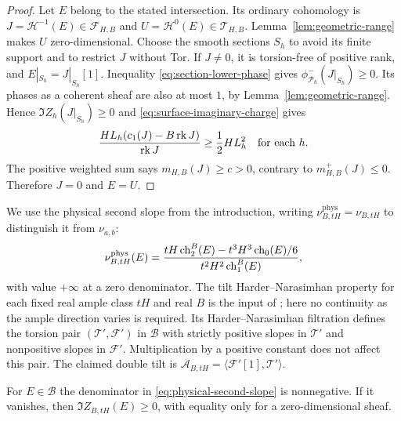 \begin{proof}
Let $E$ belong to the stated intersection.  Its ordinary cohomology is
$J=\mathcal H^{-1}(E)\in\mathcal F_{H,B}$ and
$U=\mathcal H^0(E)\in\mathcal T_{H,B}$.
Lemma~\ref{lem:geometric-range} makes $U$ zero-dimensional.
Choose the smooth sections $S_h$ to avoid its finite support and to
restrict $J$ without Tor.  If $J\ne0$, it is torsion-free of positive
rank, and $E|_{S_h}=J|_{S_h}[1]$.
Inequality \eqref{eq:section-lower-phase} gives
$\phi^-_{\mathcal P_h}(J|_{S_h})\ge0$.
Its phases as a coherent sheaf are also at most $1$, by
Lemma~\ref{lem:geometric-range}.  Hence
$\Im Z_h(J|_{S_h})\ge0$ and \eqref{eq:surface-imaginary-charge} gives
\[
 \frac{HL_h(c_1(J)-B\operatorname{rk} J)}{\operatorname{rk} J}\ge\frac12HL_h^2
 \quad\text{for each }h.
\]
The positive weighted sum says $m_{H,B}(J)\ge c>0$, contrary to
$m^+_{H,B}(J)\le0$.  Therefore $J=0$ and $E=U$.
\end{proof}

We use the physical second slope from the introduction, writing
$\nu^{\mathrm{phys}}_{B,tH}=\nu_{B,tH}$ to distinguish it from
$\nu_{a,b}$:
\begin{equation}\label{eq:physical-second-slope}
 \nu^{\mathrm{phys}}_{B,tH}(E)=
 \frac{tH\operatorname{ch}_2^B(E)-t^3H^3\operatorname{ch}_0(E)/6}
 {t^2H^2\operatorname{ch}_1^B(E)},
\end{equation}
with value $+\infty$ at a zero denominator.  The tilt
Harder--Narasimhan property for each fixed real ample class $tH$ and real
$B$ is the input of \cite[Section~2]{BMS2016}; here no continuity as the
ample direction varies is required.  Its Harder--Narasimhan filtration
defines the torsion pair $(\mathcal T',\mathcal F')$ in
$\mathcal B$ with strictly positive slopes in $\mathcal T'$ and
nonpositive slopes in $\mathcal F'$.  Multiplication by a positive
constant does not affect this pair.  The claimed double tilt is
$\mathcal A_{B,tH}=\langle\mathcal F'[1],\mathcal T'\rangle$.

\begin{lemma}\label{lem:physical-zero-denominator}
For $E\in\mathcal B$ the denominator in
\eqref{eq:physical-second-slope} is nonnegative.  If it vanishes, then
$\Im Z_{B,tH}(E)\ge0$, with equality only for a zero-dimensional sheaf.
\end{lemma}

